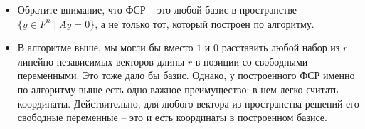 \begin{itemize}
\item Обратите внимание, что ФСР -- это любой базис в пространстве $\{y\in F^n \mid Ay = 0\}$, а не только тот, который построен по алгоритму.

\item В алгоритме выше, мы могли бы вместо $1$ и $0$ расставить любой набор из $r$ линейно независимых векторов длины $r$ в позиции со свободными переменными.
Это тоже дало бы базис.
Однако, у построенного ФСР именно по алгоритму выше есть одно важное преимущество: в нем легко считать координаты.
Действительно, для любого вектора из пространства решений его свободные переменные -- это и есть координаты в построенном базисе.
\end{itemize}